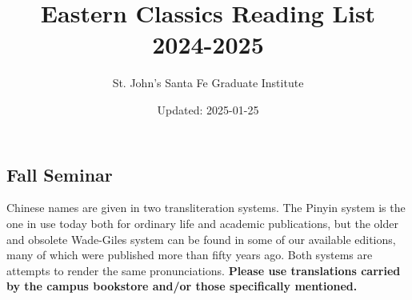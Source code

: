 \documentclass{article}
\title{Eastern Classics Reading List 2024-2025}
\author{St. John's Santa Fe Graduate Institute}
\date{Updated: 2025-01-25}
\newcounter{cntSemester} %
\begin{document}
\maketitle

\tableofcontents

\thispagestyle{fancy} %



\clearpage

\begin{center}
	\section{Fall Seminar}
\end{center}

Chinese names are given in two transliteration systems.
The Pinyin system is the one in use today both for ordinary life and academic publications, but the older and obsolete Wade-Giles system can be found in some of our available editions, many of which were published more than fifty years ago.
Both systems are attempts to render the same pronunciations.
\textbf{Please use translations carried by the campus bookstore and/or those specifically mentioned.}
\end{document}
